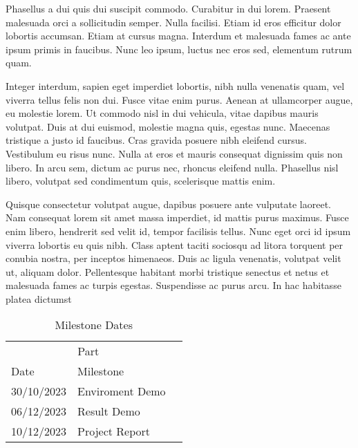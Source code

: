 \documentclass{article}
\begin{document}
Phasellus a dui quis dui suscipit commodo. Curabitur in dui lorem. Praesent malesuada orci a sollicitudin semper. Nulla facilisi. Etiam id eros efficitur dolor lobortis accumsan. Etiam at cursus magna. Interdum et malesuada fames ac ante ipsum primis in faucibus. Nunc leo ipsum, luctus nec eros sed, elementum rutrum quam.

Integer interdum, sapien eget imperdiet lobortis, nibh nulla venenatis quam, vel viverra tellus felis non dui. Fusce vitae enim purus. Aenean at ullamcorper augue, eu molestie lorem. Ut commodo nisl in dui vehicula, vitae dapibus mauris volutpat. Duis at dui euismod, molestie magna quis, egestas nunc. Maecenas tristique a justo id faucibus. Cras gravida posuere nibh eleifend cursus. Vestibulum eu risus nunc. Nulla at eros et mauris consequat dignissim quis non libero. In arcu sem, dictum ac purus nec, rhoncus eleifend nulla. Phasellus nisl libero, volutpat sed condimentum quis, scelerisque mattis enim.

Quisque consectetur volutpat augue, dapibus posuere ante vulputate laoreet. Nam consequat lorem sit amet massa imperdiet, id mattis purus maximus. Fusce enim libero, hendrerit sed velit id, tempor facilisis tellus. Nunc eget orci id ipsum viverra lobortis eu quis nibh. Class aptent taciti sociosqu ad litora torquent per conubia nostra, per inceptos himenaeos. Duis ac ligula venenatis, volutpat velit ut, aliquam dolor. Pellentesque habitant morbi tristique senectus et netus et malesuada fames ac turpis egestas. Suspendisse ac purus arcu. In hac habitasse platea dictumst
\label{milestones}

\begin{table}
  \caption{Milestone Dates}
  \label{dates-table}
  \centering
  \begin{tabular}{lll}
    \toprule
    \multicolumn{2}{c}{Part}                   \\
    \cmidrule(r){1-2}
    Date     & Milestone                       \\
    \midrule
    30/10/2023 & Enviroment Demo               \\
    06/12/2023 & Result Demo                   \\
    10/12/2023 & Project Report                \\
    \bottomrule
  \end{tabular}
\end{table}
\end{document}
